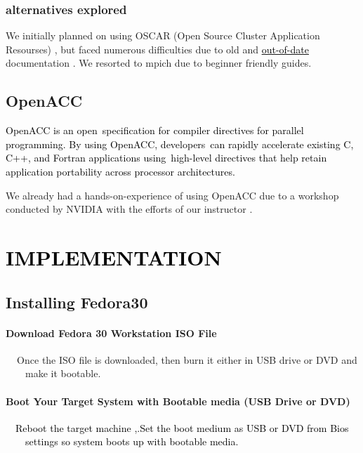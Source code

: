 \documentclass[a4paper]{article}
\begin{document}
\subsubsection[alternatives explored]{\rmfamily\bfseries alternatives explored}
We initially planned on using OSCAR (Open Source Cluster Application Resourses) , but faced numerous difficulties due to
old and \href{https://www.powerthesaurus.org/out-of-date/synonyms}{\textcolor{black}{out-of-date}} documentation . We
resorted to mpich due to beginner friendly guides. 


\bigskip

\subsection[OpenACC]{\textmd{OpenACC}}
\textcolor{black}{OpenACC is an open~specification for compiler directives for parallel programming. By using OpenACC,
developers~can rapidly accelerate existing C, C++, and Fortran applications using~high-level directives that help
retain application portability across processor architectures.}

{\color{black}
We already had a hands-on-experience of using OpenACC due to a workshop conducted by NVIDIA with the efforts of our
instructor .}

\section[]{}
\section[IMPLEMENTATION]{\textmd{\textcolor{black}{IMPLEMENTATION}}}
\subsection[Installing Fedora30]{\textmd{Installing Fedora30}}
\paragraph[Download Fedora 30 Workstation ISO File]{\color{black} Download Fedora 30 Workstation ISO File}
\textbf{\ \ }Once the ISO file is downloaded, then burn it either in USB drive or DVD and \ \ \ \ make it bootable.

\paragraph[Boot Your Target System with Bootable media (USB Drive or DVD)]{\color{black} Boot Your Target System with
Bootable media (USB Drive or DVD)}
\textcolor{black}{\ \ Reboot the target machine ,.Set the boot medium as USB or DVD from Bios \ \ \ \ settings so system
boots up with bootable media.}
\end{document}
